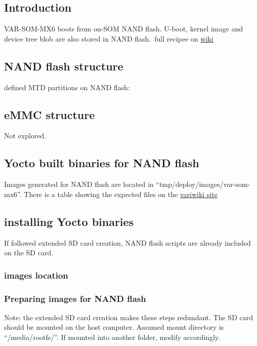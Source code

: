 \documentclass[10pt]{article}
\begin{document}
\subsection{Introduction}
VAR-SOM-MX6 boots from on-SOM NAND flash. U-boot, kernel image and device tree blob are also stored in NAND flash.\
full recipee on \href{http://variwiki.com/index.php?title=Yocto_NAND_Flash_Burning&release=RELEASE_SUMO_V1.1_VAR-SOM-MX6}{wiki}

\subsection{NAND flash structure}
defined MTD partitions on NAND flash:

\subsection{eMMC structure}
Not explored.

\subsection{Yocto built binaries for NAND flash}
Images generated for NAND flash are located in ``tmp/deploy/images/var-som-mx6''. There is a table showing the expected files on the
\href{http://variwiki.com/index.php?title=Yocto\_NAND\_Flash\_Burning&release=RELEASE\_SUMO\_V1.1\_VAR-SOM-MX6#Yocto\_Built\_binaries\_for\_NAND\_flash\_.2F\_eMMC}{variwiki site}

\subsection{installing Yocto binaries}
If followed extended SD card creation, NAND flash scripts are already included on the SD card.

\subsubsection{images location}


\subsubsection{Preparing images for NAND flash}
Note: the extended SD card creation makes these steps redundant.
The SD card should be mounted on the host computer. Assumed mount directory is ``/media/rootfs/''. If mounted into another folder, modify accordingly.\
\end{document}
